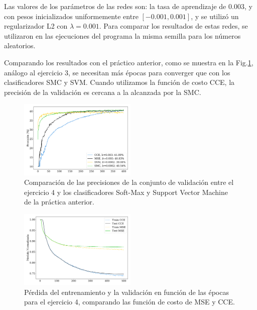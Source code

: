 Las valores de los parámetros de las redes son: la tasa de aprendizaje de $0.003$, y con pesos inicializados uniformemente entre $[-0.001, 0.001]$, y se utilizó un regularizador L2 con $\lambda=0.001$. Para comparar los resultados  de estas redes, se utilizaron en las ejecuciones del programa la misma semilla para los números aleatorios.

Comparando los resultados con el práctico anterior, como se muestra en la Fig.\ref{fig:ejer4_acc_all}, análogo al ejercicio 3, se necesitan más épocas para converger que con los clasificadores SMC y SVM. Cuando utilizamos la función de costo CCE, la precisión de la validación es cercana a la alcanzada por la SMC.

\begin{figure}[H]
    \begin{small}
        \begin{center}
            \includegraphics[width=0.5\textwidth]{Graphs/ejer4_acc_all.pdf}
        \end{center}
        \caption{Comparación de las precisiones de la conjunto de validación entre el ejercicio 4 y los clasificadores Soft-Max y Support Vector Machine de la práctica anterior.}
        \label{fig:ejer4_acc_all}
    \end{small}
\end{figure}

\begin{figure}[H]
    \begin{small}
        \begin{center}
            \includegraphics[width=0.5\textwidth]{Graphs/ejer4_loss.pdf}
        \end{center}
        \caption{Pérdida del entrenamiento y la  validación en función de las épocas para el  ejercicio 4, comparando las función de costo de MSE y CCE.}
        \label{fig:ejer4_loss}
    \end{small}
\end{figure}
